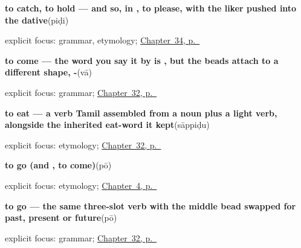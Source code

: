 \noindent\begin{minipage}[t]{\linewidth}
\raggedright
\textbf{to catch, to hold — and so, in , to please, with the liker pushed into the dative}\enspace\emph{}\enspace(piḍi)\par
\footnotesize explicit focus: grammar, etymology; \hyperref[ch:ta-verbs-between-people]{Chapter~34, p.~\pageref*{ch:ta-verbs-between-people}}
\end{minipage}\par\smallskip

\noindent\begin{minipage}[t]{\linewidth}
\raggedright
\textbf{to come — the word you say it by is , but the beads attach to a different shape, -}\enspace\emph{}\enspace(vā)\par
\footnotesize explicit focus: grammar; \hyperref[ch:ta-core-verbs]{Chapter~32, p.~\pageref*{ch:ta-core-verbs}}
\end{minipage}\par\smallskip

\noindent\begin{minipage}[t]{\linewidth}
\raggedright
\textbf{to eat — a verb Tamil assembled from a noun plus a light verb, alongside the inherited eat-word it kept}\enspace\emph{}\enspace(sāppiḍu)\par
\footnotesize explicit focus: etymology; \hyperref[ch:ta-core-verbs]{Chapter~32, p.~\pageref*{ch:ta-core-verbs}}
\end{minipage}\par\smallskip

\noindent\begin{minipage}[t]{\linewidth}
\raggedright
\textbf{to go (and , to come)}\enspace\emph{}\enspace(pō)\par
\footnotesize explicit focus: etymology; \hyperref[ch:farewells]{Chapter~4, p.~\pageref*{ch:farewells}}
\end{minipage}\par\smallskip

\noindent\begin{minipage}[t]{\linewidth}
\raggedright
\textbf{to go — the same three-slot verb with the middle bead swapped for past, present or future}\enspace\emph{}\enspace(pō)\par
\footnotesize explicit focus: grammar; \hyperref[ch:ta-core-verbs]{Chapter~32, p.~\pageref*{ch:ta-core-verbs}}
\end{minipage}\par\smallskip


